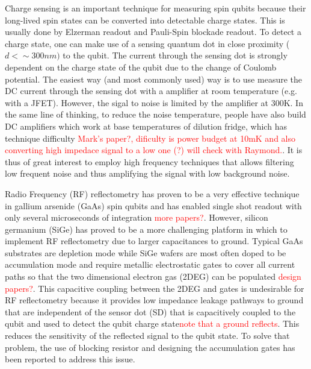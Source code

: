 \documentclass[]{article}
\begin{document}
	Charge sensing is an important technique for measuring spin qubits because their long-lived spin states can be converted into detectable charge states.  This is usually done by Elzerman readout and Pauli-Spin blockade readout\cite{elzerman2004single,harvey2018high}. To detect a charge state, one can make use of a sensing quantum dot in close proximity ($d < \sim  300nm)$ to the qubit. The current through the sensing dot is strongly dependent on the charge state of the qubit due to the change of Coulomb potential.
	The easiest way (and most commonly used) way is to use measure the DC current through the sensing dot with a amplifier at room temperature (e.g. with a JFET). However, the sigal to noise is limited by the amplifier at 300K.
	In the same line of thinking, to reduce the noise temperature, people have also build DC amplifiers which work at base temperatures of dilution fridge, which has technique difficulty \textcolor{red}{Mark's paper?, dificulty is power budget at 10mK and also converting high impedace signal to a low one (?) will check with Raymond.}. It is thus of great interest to employ high frequency techniques that allows filtering low frequent noise and thus amplifying the signal with low background noise. %
	
	Radio Frequency (RF) reflectometry has proven to be a very effective technique in gallium arsenide (GaAs) spin qubits and has enabled single shot readout with only several microseconds of integration \cite{Schoelkopf1998,fujita2017coherent} \textcolor{red}{more papers?}. However, silicon germanium (SiGe) has proved to be a more challenging platform in which to implement RF reflectometry due to larger capacitances to ground. Typical GaAs substrates are depletion mode while SiGe wafers are most often doped to be accumulation mode and require metallic electrostatic gates to cover all current paths so that the two dimensional electron gas (2DEG) can be populated \textcolor{red}{design papers?}. This capacitive coupling between the 2DEG and gates is undesirable for RF reflectometry because it provides low impedance leakage pathways to ground that are independent of the sensor dot (SD) that is capacitively coupled to the qubit and used to detect the qubit charge state\textcolor{red}{note that a ground reflects}. This reduces the sensitivity of the reflected signal to the qubit state. To solve that problem, the use of blocking resistor \cite{Volk2019} and  designing the accumulation gates \cite{Connors2020} has been reported to address this issue. %
	
\end{document}
